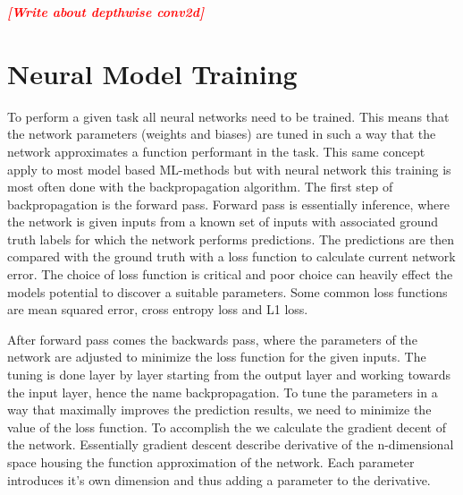 \documentclass[12pt,a4paper,english
]{tunithesis}
\newcommand{\fixthis}[1]{\textbf{\textit{\textcolor{red}{[#1]}}}}
\begin{document}
\fixthis{Write about depthwise conv2d}

\section{Neural Model Training}
To perform a given task all neural networks need to be trained. This means that the network parameters (weights and biases) are tuned in such a way that the network approximates a function performant in the task. This same concept apply to most model based ML-methods but with neural network this training is most often done with the backpropagation algorithm. The first step of backpropagation is the forward pass. Forward pass is essentially inference, where the network is given inputs from a known set of inputs with associated ground truth labels for which the network performs predictions. The predictions are then compared with the ground truth with a loss function to calculate current network error. The choice of loss function is critical and poor choice can heavily effect the models potential to discover a suitable parameters. Some common loss functions are mean squared error, cross entropy loss and L1 loss.

After forward pass comes the backwards pass, where the parameters of the network are adjusted to minimize the loss function for the given inputs. The tuning is done layer by layer starting from the output layer and working towards the input layer, hence the name backpropagation. To tune the parameters in a way that maximally improves the prediction results, we need to minimize the value of the loss function. To accomplish the we calculate the gradient decent of the network. Essentially gradient descent describe derivative of the n-dimensional space housing the function approximation of the network. Each parameter introduces it's own dimension and thus adding a parameter to the derivative.
\end{document}
